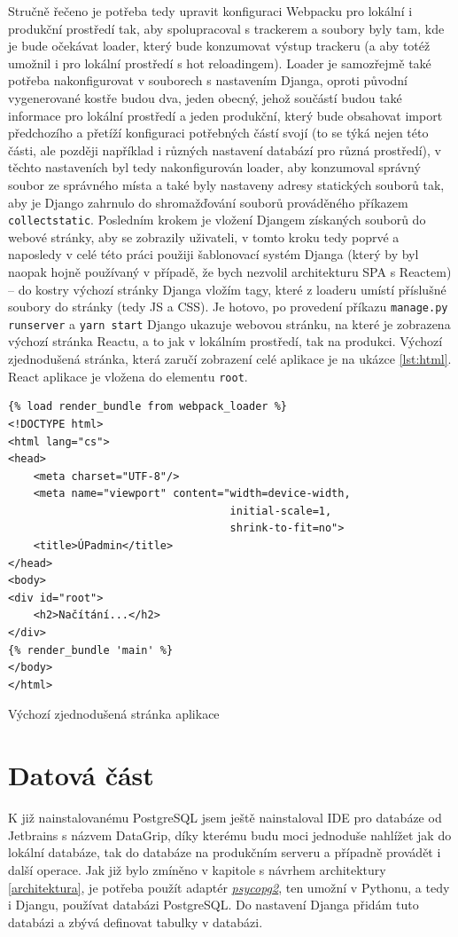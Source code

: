     Stručně řečeno je potřeba tedy upravit konfiguraci Webpacku pro lokální i produkční prostředí tak, aby spolupracoval s trackerem a soubory byly tam, kde je bude očekávat loader, který bude konzumovat výstup trackeru (a aby totéž umožnil i pro lokální prostředí s hot reloadingem). Loader je samozřejmě také potřeba nakonfigurovat v souborech s nastavením Djanga, oproti původní vygenerované kostře budou dva, jeden obecný, jehož součástí budou také informace pro lokální prostředí a jeden produkční, který bude obsahovat import předchozího a přetíží konfiguraci potřebných částí svojí (to se týká nejen této části, ale později například i různých nastavení databází pro různá prostředí), v těchto nastaveních byl tedy nakonfigurován loader, aby konzumoval správný soubor ze správného místa a také byly nastaveny adresy statických souborů tak, aby je Django zahrnulo do shromažďování souborů prováděného příkazem \verb|collectstatic|. Posledním krokem je vložení Djangem získaných souborů do webové stránky, aby se zobrazily uživateli, v tomto kroku tedy poprvé a naposledy v celé této práci použiji šablonovací systém Djanga (který by byl naopak hojně používaný v případě, že bych nezvolil architekturu SPA s Reactem) -- do kostry výchozí stránky Djanga vložím tagy, které z loaderu umístí příslušné soubory do stránky (tedy JS a CSS). Je hotovo, po provedení příkazu \verb|manage.py runserver| a \verb|yarn start| Django ukazuje webovou stránku, na které je zobrazena výchozí stránka Reactu, a to jak v lokálním prostředí, tak na produkci. Výchozí zjednodušená stránka, která zaručí zobrazení celé aplikace je na ukázce \ref{lst:html}. React aplikace je vložena do elementu \verb|root|.
    
    \begin{listing}[ht]
    	\begin{verbatim}
{% load render_bundle from webpack_loader %}
<!DOCTYPE html>
<html lang="cs">
<head>
    <meta charset="UTF-8"/>
    <meta name="viewport" content="width=device-width,
                                   initial-scale=1,
                                   shrink-to-fit=no">
    <title>ÚPadmin</title>
</head>
<body>
<div id="root">
    <h2>Načítání...</h2>
</div>
{% render_bundle 'main' %}
</body>
</html>
    	\end{verbatim}
    	\caption{Výchozí zjednodušená stránka aplikace}\label{lst:html}
    \end{listing}
    
    \section{Datová část}\label{sec:datovaCast}
    K již nainstalovanému PostgreSQL jsem ještě nainstaloval IDE pro databáze od Jetbrains s názvem DataGrip, díky kterému budu moci jednoduše nahlížet jak do lokální databáze, tak do databáze na produkčním serveru a případně provádět i další operace. Jak již bylo zmíněno v kapitole s návrhem architektury \ref{architektura}, je potřeba použít adaptér \href{http://initd.org/psycopg/}{\textit{psycopg2}}, ten umožní v Pythonu, a tedy i Djangu, používat databázi PostgreSQL. Do nastavení Djanga přidám tuto databázi a zbývá definovat tabulky v databázi.
    
